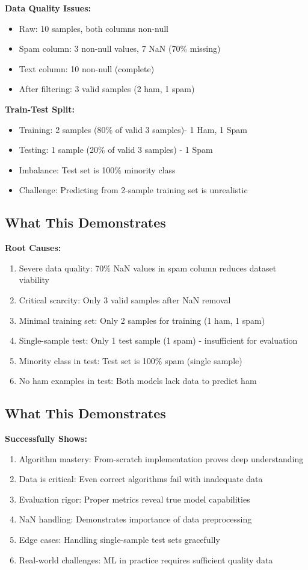 \documentclass[14pt,a4paper]{report}
\begin{document}
\textbf{Data Quality Issues:}
\begin{itemize}
    \item Raw: 10 samples, both columns non-null
    \item Spam column: 3 non-null values, 7 NaN (70\% missing)
    \item Text column: 10 non-null (complete)
    \item After filtering: 3 valid samples (2 ham, 1 spam)
\end{itemize}

\textbf{Train-Test Split:}
\begin{itemize}
    \item Training: 2 samples (80\% of valid 3 samples)- 1 Ham, 1 Spam
    \item Testing: 1 sample (20\% of valid 3 samples) - 1 Spam
    \item Imbalance: Test set is 100\% minority class
    \item Challenge: Predicting from 2-sample training set is unrealistic
\end{itemize}

\subsection{What This Demonstrates}

\textbf{Root Causes:}
\begin{enumerate}
    \item Severe data quality: 70\% NaN values in spam column reduces dataset viability
    \item Critical scarcity: Only 3 valid samples after NaN removal
    \item Minimal training set: Only 2 samples for training (1 ham, 1 spam)
    \item Single-sample test: Only 1 test sample (1 spam) - insufficient for evaluation
    \item Minority class in test: Test set is 100\% spam (single sample)
    \item No ham examples in test: Both models lack data to predict ham
\end{enumerate}

\subsection{What This Demonstrates}

\textbf{Successfully Shows:}
\begin{enumerate}
    \item Algorithm mastery: From-scratch implementation proves deep understanding
    \item Data is critical: Even correct algorithms fail with inadequate data
    \item Evaluation rigor: Proper metrics reveal true model capabilities
    \item NaN handling: Demonstrates importance of data preprocessing
    \item Edge cases: Handling single-sample test sets gracefully
    \item Real-world challenges: ML in practice requires sufficient quality data
\end{enumerate}
\end{document}
